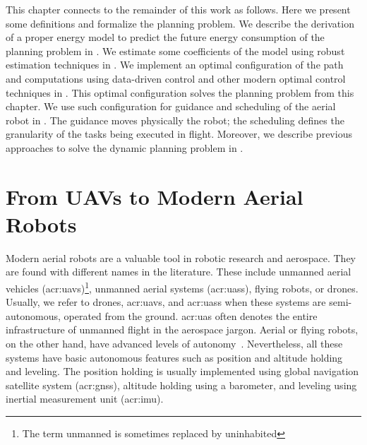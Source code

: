 This chapter connects to the remainder of this work as follows. Here we present some definitions and formalize the planning problem. We describe the derivation of a proper energy model to predict the future energy consumption of the planning problem in . We estimate some coefficients of the model using robust estimation techniques in . We implement an optimal configuration of the path and computations using data-driven control and other modern optimal control techniques in . This optimal configuration solves the planning problem from this chapter. We use such configuration for guidance and scheduling of the aerial robot in . The guidance moves physically the robot; the scheduling defines the granularity of the tasks being executed in flight. Moreover, we describe previous approaches to solve the dynamic planning problem in . 


\section{From UAVs to Modern Aerial Robots}

Modern aerial robots are a valuable tool in robotic research and aerospace. They are found with different names in the literature. These include unmanned aerial vehicles (\Gls{acr:uav}s)\footnote{The term unmanned is sometimes replaced by uninhabited}, unmanned aerial systems (\Gls{acr:uas}s), flying robots, or drones. Usually, we refer to drones, \Gls{acr:uav}s, and \Gls{acr:uas}s when these systems are semi-autonomous, operated from the ground. \Gls{acr:uas} often denotes the entire infrastructure of unmanned flight in the aerospace jargon. Aerial or flying robots, on the other hand, have advanced levels of autonomy~\citep{siciliano2016springer}. Nevertheless, all these systems have basic autonomous features such as position and altitude holding and leveling. The position holding is usually implemented using global navigation satellite system (\Gls{acr:gnss}), altitude holding using a barometer, and leveling using inertial measurement unit (\Gls{acr:imu}).

